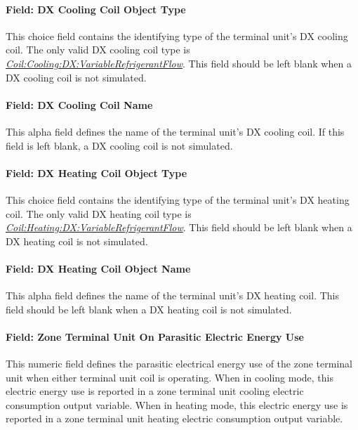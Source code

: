 \paragraph{Field: DX Cooling Coil Object Type}\label{field-dx-cooling-coil-object-type}

This choice field contains the identifying type of the terminal unit's DX cooling coil. The only valid DX cooling coil type is \textit{\hyperref[coilcoolingdxvariablerefrigerantflow]{Coil:Cooling:DX:VariableRefrigerantFlow}}. This field should be left blank when a DX cooling coil is not simulated.

\paragraph{Field: DX Cooling Coil Name}\label{field-dx-cooling-coil-name-1}

This alpha field defines the name of the terminal unit's DX cooling coil. If this field is left blank, a DX cooling coil is not simulated.

\paragraph{Field: DX Heating Coil Object Type}\label{field-dx-heating-coil-object-type}

This choice field contains the identifying type of the terminal unit's DX heating coil. The only valid DX heating coil type is \textit{\hyperref[coilheatingdxvariablerefrigerantflow]{Coil:Heating:DX:VariableRefrigerantFlow}}. This field should be left blank when a DX heating coil is not simulated.

\paragraph{Field: DX Heating Coil Object Name}\label{field-dx-heating-coil-object-name}

This alpha field defines the name of the terminal unit's DX heating coil. This field should be left blank when a DX heating coil is not simulated.

\paragraph{Field: Zone Terminal Unit On Parasitic Electric Energy Use}\label{field-zone-terminal-unit-on-parasitic-electric-energy-use-000}

This numeric field defines the parasitic electrical energy use of the zone terminal unit when either terminal unit coil is operating. When in cooling mode, this electric energy use is reported in a zone terminal unit cooling electric consumption output variable. When in heating mode, this electric energy use is reported in a zone terminal unit heating electric consumption output variable.

